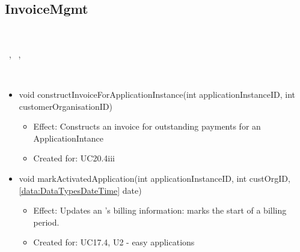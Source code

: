   \subsection{InvoiceMgmt}\label{int:OnlineServiceOnlineServiceInvoiceManagerInvoiceMgmt}
    \begin{description}
      \item[Provided by:] \iconcomponent{}~
      \item[Required by:] \iconcomponent{}~, \iconcomponent{}~, \iconcomponent{}~
      \item[Operations:] ~
    \begin{itemize}[noitemsep,nolistsep,leftmargin=-.25cm]
      \item \textsf{void constructInvoiceForApplicationInstance(int applicationInstanceID, int customerOrganisationID)}
        \begin{itemize}[noitemsep,nolistsep]
           \item Effect: Constructs an invoice for outstanding payments for an ApplicationIntance
\item Created for: UC20.4iii
        \end{itemize}
      \item \textsf{void markActivatedApplication(int applicationInstanceID, int custOrgID, \ref{data:DataTypesDateTime} date)}
        \begin{itemize}[noitemsep,nolistsep]
           \item Effect: Updates an 's billing information: marks the start of a billing period.
\item Created for: UC17.4, U2 - easy applications
        \end{itemize}
    \end{itemize}
    \end{description}

